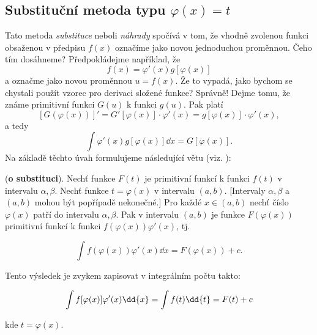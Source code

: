     \subsection{Substituční metoda typu \(\varphi(x) = t\)}\label{mai:IchapVIIsecIIIssecIII}
      Tato metoda \emph{substituce} neboli \emph{náhrady} spočívá v tom, že vhodně zvolenou funkci
      obsaženou v předpisu \(f(x)\) označíme jako novou jednoduchou proměnnou. Čeho tím dosáhneme?
      Předpokládejme například, že \[f(x)=\varphi'(x)g[\varphi(x)]\] a označme jako novou proměnnou
      \(u = f(x)\). Že to vypadá, jako bychom se chystali použít vzorec pro derivaci složené funkce?
      Správně! Dejme tomu, že známe primitivní funkci \(G(u)\) k funkci \(g(u)\). Pak platí
      \begin{equation*}
        \left[G\left(\varphi(x)\right)\right]' = G'\left[\varphi(x)\right]\cdot\varphi'(x) 
        = g\left[\varphi(x)\right]\cdot\varphi'(x),     
      \end{equation*}
      a tedy
      \begin{equation*}
        \int \varphi'(x) g\left[\varphi(x)\right]\dd{x} =  G\left[\varphi(x)\right]. 
      \end{equation*}      
      Na základě těchto úvah formulujeme následující větu (viz. \cite[p.~142]{diblik2002}):
      \begin{mdframed}[style=mdmathlemma]
        \begin{lemma}\label{mai:lemma009}          
          (\textbf{o substituci}). Nechť funkce \(F(t)\) je primitivní funkcí k funkci \(f(t)\) v
          intervalu \(\alpha, \beta\). Nechť funkce \(t = \varphi(x)\) v intervalu \((a,b)\).
          [Intervaly \(\alpha, \beta\) a \((a,b)\) mohou být popřípadě nekonečné.] Pro každé
          \(x\in(a,b)\) nechť číslo \(\varphi(x)\) patří do intervalu \(\alpha, \beta\). Pak v
          intervalu \((a,b)\) je funkce \(F(\varphi(x))\) primitivní funkcí k funkci
          \(f(\varphi(x))\varphi'(x)\), tj. 
          \begin{fleqn}[0pt]
            \begin{equation}\label{mai:eq176}
              \int{f(\varphi(x))\varphi'(x)\dd{x}} = F(\varphi(x)) + c.
            \end{equation}
          \end{fleqn}
          Tento výsledek je zvykem zapisovat v integrálním počtu takto:
          \begin{fleqn}[0pt]
            \begin{equation}\label{mai:eq177}
              \int{f[\varphi(x)]\varphi'(x)\dd{x}}= \int f(t)\dd{t}= F(t)+c
              \raisetag{14pt}
            \end{equation}
          \end{fleqn}
          kde \(t=\varphi(x)\).
        \end{lemma}
      \end{mdframed}
  

